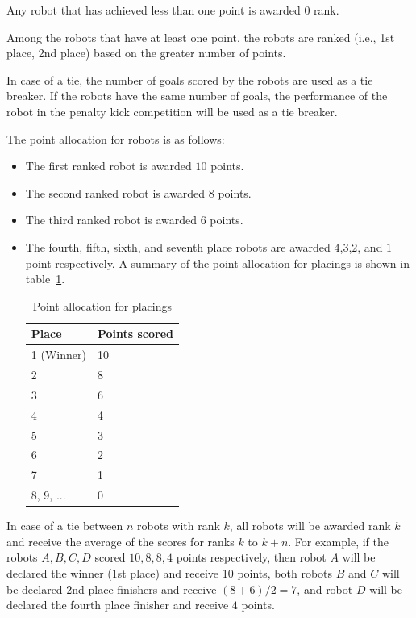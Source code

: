 \documentclass[12pt]{hurocup}
\begin{document}

\begin{lawlist}[US]
\item Any robot that has achieved less than one point is awarded $0$
  rank.

\item Among the robots that have at least one point, the robots are
  ranked (i.e., 1st place, 2nd place) based on the greater number of
  points.

\item In case of a tie, the number of goals scored by the robots are
  used as a tie breaker. If the robots have the same number of goals,
  the performance of the robot in the penalty kick competition will be
  used as a tie breaker.

\item The point allocation for robots is as follows:
  \begin{itemize}
  \item The first ranked robot is awarded $10$ points.
  \item The second ranked robot is awarded $8$ points.
  \item The third ranked robot is awarded $6$ points.
  \item The fourth, fifth, sixth, and seventh place robots are awarded
    $4$,$3$,$2$, and $1$ point respectively.  A summary of the point
    allocation for placings is shown in table~\ref{point-allocation}.

    \begin{table}
      \begin{center}
        \begin{tabular}{l|l}
          \hline
          Place & Points scored \\
          \hline
          1 (Winner) & 10 \\
          2          & 8 \\
          3          & 6 \\
          4          & 4 \\
          5          & 3 \\
          6          & 2 \\
          7          & 1 \\
          8, 9, ...  & 0 \\
          \hline
        \end{tabular}
      \end{center}
      \caption{Point allocation for placings}
      \label{point-allocation}
    \end{table}
  \end{itemize}

\item In case of a tie between $n$ robots with rank $k$, all robots
  will be awarded rank $k$ and receive the average of the scores for
  ranks $k$ to $k+n$.  For example, if the robots $A,B,C,D$ scored
  $10, 8, 8, 4$ points respectively, then robot $A$ will be declared
  the winner (1st place) and receive 10 points, both robots $B$ and
  $C$ will be declared 2nd place finishers and receive $(8+6)/2=7$,
  and robot $D$ will be declared the fourth place finisher and receive
  $4$ points.

\end{lawlist}
\end{document}
